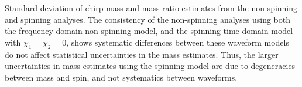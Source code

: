 \label{fig:mass_std} Standard deviation of chirp-mass and mass-ratio estimates from the non-spinning and spinning analyses.  The consistency of the non-spinning analyses using both the frequency-domain non-spinning model, and the spinning time-domain model with $\chi_1=\chi_2=0$, shows systematic differences between these waveform models do not affect statistical uncertainties in the mass estimates.  Thus, the larger uncertainties in mass estimates using the spinning model are due to degeneracies between mass and spin, and not systematics between waveforms.